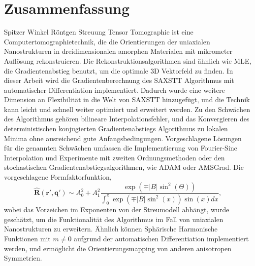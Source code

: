 \pagebreak
\chapter*{Zusammenfassung}
Spitzer Winkel Röntgen Streuung Tensor Tomographie ist eine Computertomographietechnik,
die die Orientierungen der uniaxialen Nanostrukturen in dreidimensionalen amorphen Materialen mit mikrometer Auflösung rekonstruieren.
Die Rekonstruktionsalgorithmen sind ähnlich wie MLE, die Gradientenabstieg benutzt, um die optimale 3D Vektorfeld zu finden.
In dieser Arbeit wird die Gradientenberechnung des SAXSTT Algorithmus mit automatischer Differentiation implementiert.
Dadurch wurde eine weitere Dimension an Flexibilität in die Welt von SAXSTT hinzugefügt, und die Technik kann leicht und schnell weiter optimiert und erweitert werden.
Zu den Schwächen des Algorithmus gehören bilineare Interpolationsfehler,
und das Konvergieren des deterministischen konjugierten Gradientenabstiegs Algorithmus zu lokalen Minima ohne ausreichend gute Anfangsbedingungen. %
Vorgeschlagene Lösungen für die genannten Schwächen umfassen die Implementierung von Fourier-Sinc Interpolation und Experimente mit zweiten Ordnungsmethoden oder den stochastischen Gradientenabstiegsalgorithmen, wie ADAM oder AMSGrad.
Die vorgeschlagene Formfaktorfunktion,
\begin{equation*}
    \bm{\widehat{R}}(\bm{r'}, \bm{q'}) \sim A_{0}^{2} + A_{1}^{2}\frac{ \exp\left(\mp |B| \sin^2(\Theta) \right) } {\int_{0}^{\pi} \exp\left( \mp |B| \sin^{2}(x) \right) \sin(x) dx},
\end{equation*}
wobei das Vorzeichen im Exponenten von der Streumodell abhängt, wurde geschätzt, um die Funktionalität des Algorithmus im Fall von uniaxialen Nanostrukturen zu erweitern.
Ähnlich können Sphärische Harmonische Funktionen mit $m \neq 0$ aufgrund der automatischen Differentiation implementiert werden,
und ermöglicht die Orientierungsmapping von anderen anisotropen Symmetrien.


\endgroup

\vfill

